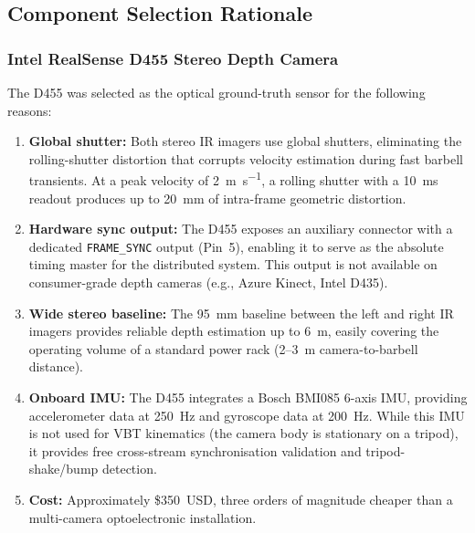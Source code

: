 \subsection{Component Selection Rationale}

\subsubsection{Intel RealSense D455 Stereo Depth Camera}
The D455 was selected as the optical ground-truth sensor for the following reasons:
\begin{enumerate}[nosep]
  \item \textbf{Global shutter:} Both stereo IR imagers use global shutters, eliminating the rolling-shutter distortion that corrupts velocity estimation during fast barbell transients. At a peak velocity of \SI{2}{\metre\per\second}, a rolling shutter with a \SI{10}{\milli\second} readout produces up to \SI{20}{\milli\metre} of intra-frame geometric distortion.
  \item \textbf{Hardware sync output:} The D455 exposes an auxiliary connector with a dedicated \texttt{FRAME\_SYNC} output (Pin~5), enabling it to serve as the absolute timing master for the distributed system. This output is not available on consumer-grade depth cameras (e.g., Azure Kinect, Intel D435).
  \item \textbf{Wide stereo baseline:} The \SI{95}{\milli\metre} baseline between the left and right IR imagers provides reliable depth estimation up to \SI{6}{\metre}, easily covering the operating volume of a standard power rack (\SI{2}{}--\SI{3}{\metre} camera-to-barbell distance).
  \item \textbf{Onboard IMU:} The D455 integrates a Bosch BMI085 6-axis IMU, providing accelerometer data at \SI{250}{\hertz} and gyroscope data at \SI{200}{\hertz}. While this IMU is not used for VBT kinematics (the camera body is stationary on a tripod), it provides free cross-stream synchronisation validation and tripod-shake/bump detection.
  \item \textbf{Cost:} Approximately \$350~USD, three orders of magnitude cheaper than a multi-camera optoelectronic installation.
\end{enumerate}

